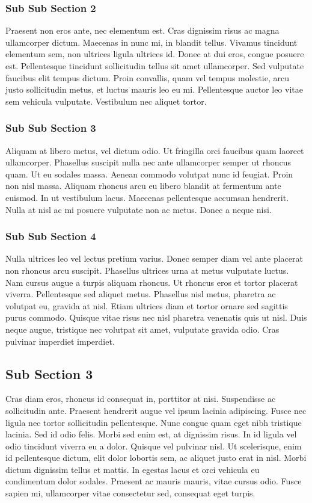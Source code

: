 \documentclass[../thesis.tex]{subfiles}
\begin{document}
\subsubsection{Sub Sub Section 2}
Praesent non eros ante, nec elementum est. Cras dignissim risus ac magna ullamcorper dictum. Maecenas in nunc mi, in blandit tellus. Vivamus tincidunt elementum sem, non ultrices ligula ultrices id. Donec at dui eros, congue posuere est. Pellentesque tincidunt sollicitudin tellus sit amet ullamcorper. Sed vulputate faucibus elit tempus dictum. Proin convallis, quam vel tempus molestie, arcu justo sollicitudin metus, et luctus mauris leo eu mi. Pellentesque auctor leo vitae sem vehicula vulputate. Vestibulum nec aliquet tortor.

\subsubsection{Sub Sub Section 3}
Aliquam at libero metus, vel dictum odio. Ut fringilla orci faucibus quam laoreet ullamcorper. Phasellus suscipit nulla nec ante ullamcorper semper ut rhoncus quam. Ut eu sodales massa. Aenean commodo volutpat nunc id feugiat. Proin non nisl massa. Aliquam rhoncus arcu eu libero blandit at fermentum ante euismod. In ut vestibulum lacus. Maecenas pellentesque accumsan hendrerit. Nulla at nisl ac mi posuere vulputate non ac metus. Donec a neque nisi.

\subsubsection{Sub Sub Section 4}
Nulla ultrices leo vel lectus pretium varius. Donec semper diam vel ante placerat non rhoncus arcu suscipit. Phasellus ultrices urna at metus vulputate luctus. Nam cursus augue a turpis aliquam rhoncus. Ut rhoncus eros et tortor placerat viverra. Pellentesque sed aliquet metus. Phasellus nisl metus, pharetra ac volutpat eu, gravida at nisl. Etiam ultrices diam et tortor ornare sed sagittis purus commodo. Quisque vitae risus nec nisl pharetra venenatis quis ut nisl. Duis neque augue, tristique nec volutpat sit amet, vulputate gravida odio. Cras pulvinar imperdiet imperdiet.

\subsection{Sub Section 3}
Cras diam eros, rhoncus id consequat in, porttitor at nisi. Suspendisse ac sollicitudin ante. Praesent hendrerit augue vel ipsum lacinia adipiscing. Fusce nec ligula nec tortor sollicitudin pellentesque. Nunc congue quam eget nibh tristique lacinia. Sed id odio felis. Morbi sed enim est, at dignissim risus. In id ligula vel odio tincidunt viverra eu a dolor. Quisque vel pulvinar nisl. Ut scelerisque, enim id pellentesque dictum, elit dolor lobortis sem, ac aliquet justo erat in nisl. Morbi dictum dignissim tellus et mattis. In egestas lacus et orci vehicula eu condimentum dolor sodales. Praesent ac mauris mauris, vitae cursus odio. Fusce sapien mi, ullamcorper vitae consectetur sed, consequat eget turpis.
\end{document}
